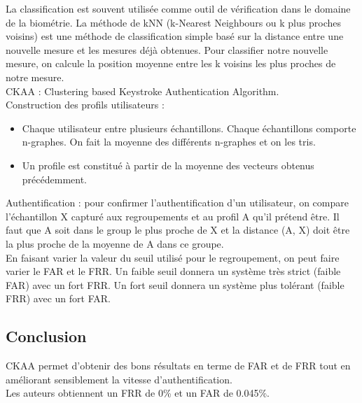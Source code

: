 La classification est souvent utilisée comme outil de vérification dans le domaine de la biométrie. La méthode de kNN (k-Nearest Neighbours ou k plus proches voisins) est une méthode de classification simple basé sur la distance entre une nouvelle mesure et les mesures déjà obtenues. Pour classifier notre nouvelle mesure, on calcule la position moyenne entre les k voisins les plus proches de notre mesure.\\

CKAA : Clustering based Keystroke Authentication Algorithm.\\

Construction des profils utilisateurs :\\

\begin{itemize}
  \item Chaque utilisateur entre plusieurs échantillons. Chaque échantillons comporte n-graphes. On fait la moyenne des différents n-graphes et on les tris.
  \item Un profile est constitué à partir de la moyenne des vecteurs obtenus précédemment.\\
\end{itemize}

Authentification : pour confirmer l'authentification d'un utilisateur, on compare l'échantillon X capturé aux regroupements et au profil A qu'il prétend être. Il faut que A soit dans le group le plus proche de X et la distance (A, X) doit être la plus proche de la moyenne de A dans ce groupe.\\

En faisant varier la valeur du seuil utilisé pour le regroupement, on peut faire varier le FAR et le FRR. Un faible seuil donnera un système très strict (faible FAR) avec un fort FRR. Un fort seuil donnera un système plus tolérant (faible FRR) avec un fort FAR.

\subsection{Conclusion}

CKAA permet d'obtenir des bons résultats en terme de FAR et de FRR tout en améliorant sensiblement la vitesse d'authentification.\\

Les auteurs obtiennent un FRR de 0\% et un FAR de 0.045\%.
